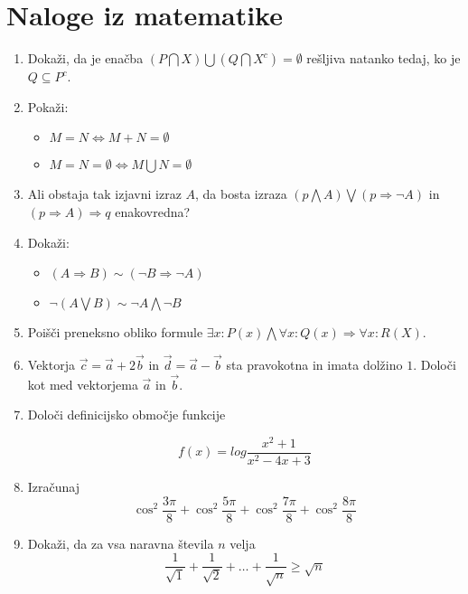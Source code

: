 \documentclass[a4paper,12pt]{article}
\begin{document}
\section*{Naloge iz matematike}
\begin{enumerate}
    

\item Dokaži, da je enačba $ ( P \bigcap X ) \bigcup ( Q \bigcap X^c ) =  \emptyset $
rešljiva natanko tedaj, ko je $Q \subseteq P^c $.

\item Pokaži:
\begin{itemize}
    \item $M = N \iff M + N = \emptyset $
    \item $M = N = \emptyset \iff M \bigcup N = \emptyset $
\end{itemize}


\item Ali obstaja tak izjavni izraz $ A $, da bosta izraza
$ (p \bigwedge A ) \bigvee (p \Rightarrow \neg A )  $ in $ (p \Rightarrow A) \Rightarrow q $
enakovredna?

\item Dokaži:
\begin{itemize}
    \item $(A \Rightarrow B) \sim (\neg B \Rightarrow \neg A )  $
    \item $ \neg (A \bigvee B) \sim \neg A \bigwedge \neg B $
\end{itemize}

\item Poišči preneksno obliko formule $ \exists x : P(x) \bigwedge \forall x : Q(x) \Rightarrow \forall x : R(X) $.

\item Vektorja $\vec{c} = \vec{a} + 2\vec{b} $ in $\vec{d} = \vec{a} - \vec{b}$
sta pravokotna in imata dolžino $1$. Določi kot med vektorjema $\vec{a}$ in $\vec{b}$.

\item Določi definicijsko območje funkcije

    \[ f(x) = log \dfrac{x^2 + 1}{x^2 - 4x + 3} \]


\item Izračunaj
\[ \cos^2 \dfrac{3 \pi}{8} + \cos^2\dfrac{5\pi}{8} + \cos^2\dfrac{7\pi}{8} + \cos^2\dfrac{8\pi}{8} \]

\item Dokaži, da za vsa naravna števila $n$ velja
\[ \dfrac{1}{\sqrt{1}} + \dfrac{1}{\sqrt{2}} + \dots + \dfrac{1}{\sqrt{n}} \ge \sqrt{n}    \]


\end{enumerate}
\end{document}
